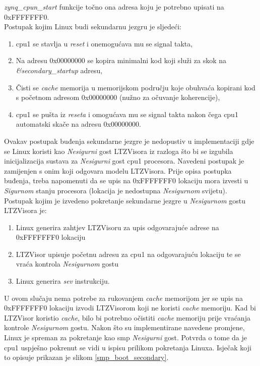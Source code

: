 \documentclass[times, utf8, diplomski, numeric]{fer}
\begin{document}
\textit{zynq\_cpun\_start} funkcije točno ona adresa koju je potrebno upisati na 0xFFFFFFF0.\\
Postupak kojim Linux budi sekundarnu jezgru je sljedeći:
\begin{enumerate}
  \item{\gls{cpu}1 se stavlja u \textit{reset} i onemogućava mu se signal takta,}
  \item{Na adresu 0x00000000 se kopira minimalni kod koji služi za skok na \textit{\&secondary\_startup} adresu,}
  \item{Čisti se \textit{cache} memorija u memorijskom području koje obuhvaća kopirani kod s početnom adresom
  0x00000000 (nužno za očuvanje koherencije),}
  \item{\gls{cpu}1 se pušta iz \textit{reseta} i omogućava mu se signal takta nakon čega \gls{cpu}1 automatski skače na adresu
  0x00000000.}
\end{enumerate}
Ovakav postupak buđenja sekundarne jezgre je nedopustiv u implementaciji gdje se Linux koristi kao \textit{Nesigurni} gost
LTZVisora iz razloga što bi se izgubila inicijalizacija sustava za \textit{Nesigurni} gost \gls{cpu}1 procesora. Navedeni postupak
je zamijenjen s onim koji odgovara modelu LTZVisora. Prije opisa postupka buđenja, treba napomenuti da se upis na
0xFFFFFFF0 lokaciju mora izvesti u \textit{Sigurnom} stanju procesora (lokacija je nedostupna \textit{Nesigurnom}
svijetu). Postupak kojim je izvedeno pokretanje sekundarne jezgre u \textit{Nesigurnom} gostu LTZVisora je:
\begin{enumerate}
  \item {Linux generira zahtjev LTZVisoru za upis odgovarajuće adrese na 0xFFFFFFF0 lokaciju}
  \item{LTZVisor upisuje početnu adresu za \gls{cpu}1 na odgovarajuću lokaciju te se vraća kontrola \textit{Nesigurnom} gostu}
  \item{Linux generira \textit{sev} instrukciju.}
\end{enumerate}
U ovom slučaju nema potrebe za rukovanjem \textit{cache} memorijom jer se upis na 0xFFFFFFF0 lokaciju izvodi
LTZVisorom koji ne koristi \textit{cache} memoriju. Kad bi LTZVisor koristio \textit{cache}, bilo bi potrebno očistiti
\textit{cache} memoriju prije vraćanja kontrole \textit{Nesigurnom} gostu. Nakon što su implementirane navedene promjene,
Linux je spreman za pokretanje kao \gls{smp} \textit{Nesigurni} gost. Potvrda o tome da je \gls{cpu}1 uspješno pokrenut se vidi u ispisu
prilikom pokretanja Linuxa. Isječak koji to opisuje prikazan je slikom \ref{smp_boot_secondary}.
\end{document}
